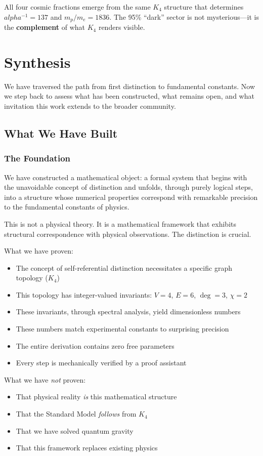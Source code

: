 \documentclass[11pt,a4paper]{book}
\def\alpha{alpha}%
\begin{document}
All four cosmic fractions emerge from the same $K_4$ structure that determines 
$\alpha^{-1} = 137$ and $m_p/m_e = 1836$. The 95\% ``dark'' sector is not mysterious---it 
is the \textbf{complement} of what $K_4$ renders visible.

\part{Synthesis}

We have traversed the path from first distinction to fundamental constants. Now we step back to assess what has been constructed, what remains open, and what invitation this work extends to the broader community.

\chapter{What We Have Built}

\section{The Foundation}

We have constructed a mathematical object: a formal system that begins with the unavoidable concept of distinction and unfolds, through purely logical steps, into a structure whose numerical properties correspond with remarkable precision to the fundamental constants of physics.

This is not a physical theory. It is a mathematical framework that exhibits structural correspondence with physical observations. The distinction is crucial.

What we have proven:
\begin{itemize}
\item The concept of self-referential distinction necessitates a specific graph topology ($K_4$)
\item This topology has integer-valued invariants: $V=4$, $E=6$, $\deg=3$, $\chi=2$
\item These invariants, through spectral analysis, yield dimensionless numbers
\item These numbers match experimental constants to surprising precision
\item The entire derivation contains zero free parameters
\item Every step is mechanically verified by a proof assistant
\end{itemize}

What we have \emph{not} proven:
\begin{itemize}
\item That physical reality \emph{is} this mathematical structure
\item That the Standard Model \emph{follows} from $K_4$
\item That we have solved quantum gravity
\item That this framework replaces existing physics
\end{itemize}
\end{document}
